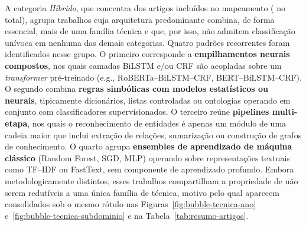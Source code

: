 
A categoria \emph{Híbrido}, que concentra \percHibrido{} dos artigos
incluídos no mapeamento (\totalIncluidos{} no total), agrupa trabalhos
cuja arquitetura predominante combina, de forma essencial, mais de
uma família técnica e que, por isso, não admitem classificação
unívoca em nenhuma das demais categorias. Quatro padrões recorrentes
foram identificados nesse grupo. O primeiro corresponde a
\textbf{empilhamentos neurais compostos}, nos quais camadas BiLSTM
e/ou CRF são acopladas sobre um \emph{transformer} pré-treinado
(e.g., RoBERTa--BiLSTM--CRF, BERT--BiLSTM--CRF). O segundo combina
\textbf{regras simbólicas com modelos estatísticos ou neurais},
tipicamente dicionários, listas controladas ou ontologias operando
em conjunto com classificadores supervisionados. O terceiro reúne
\textbf{pipelines multi-etapa}, nos quais o reconhecimento de
entidades é apenas um módulo de uma cadeia maior que inclui extração
de relações, sumarização ou construção de grafos de conhecimento. O
quarto agrupa \textbf{ensembles de aprendizado de máquina clássico}
(Random Forest, SGD, MLP) operando sobre representações textuais
como TF--IDF ou FastText, sem componente de aprendizado profundo.
Embora metodologicamente distintos, esses trabalhos compartilham a
propriedade de não serem redutíveis a uma única família de técnica,
motivo pelo qual aparecem consolidados sob o mesmo rótulo nas
Figuras~\ref{fig:bubble-tecnica-ano}
e~\ref{fig:bubble-tecnica-subdominio} e na
Tabela~\ref{tab:resumo-artigos}.
